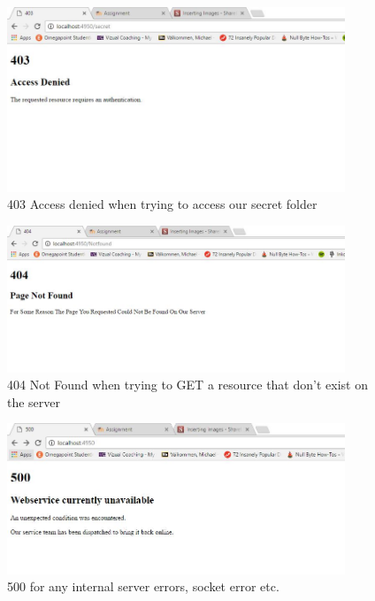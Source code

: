 \documentclass[a4paper,12pt]{article}
\numberwithin{figure}{section}
\begin{document}
\begin{figure}[h!]
	\centering
	\label{Access denied}
	\includegraphics[width=0.90\textwidth,keepaspectratio]{img/403.jpg} 
	\caption{403 Access denied when trying to access our secret folder}
\end{figure}

\begin{figure}[h!]
	\centering
	\label{not found}
	\includegraphics[width=0.90\textwidth,keepaspectratio]{img/404.jpg} 
	\caption{404 Not Found when trying to GET a resource that don't exist on the server}
\end{figure}

\begin{figure}[h!]
	\centering
	\label{Server error}
	\includegraphics[width=0.90\textwidth,keepaspectratio]{img/500.jpg} 
	\caption{500 for any internal server errors, socket error etc.}
\end{figure}
\end{document}
